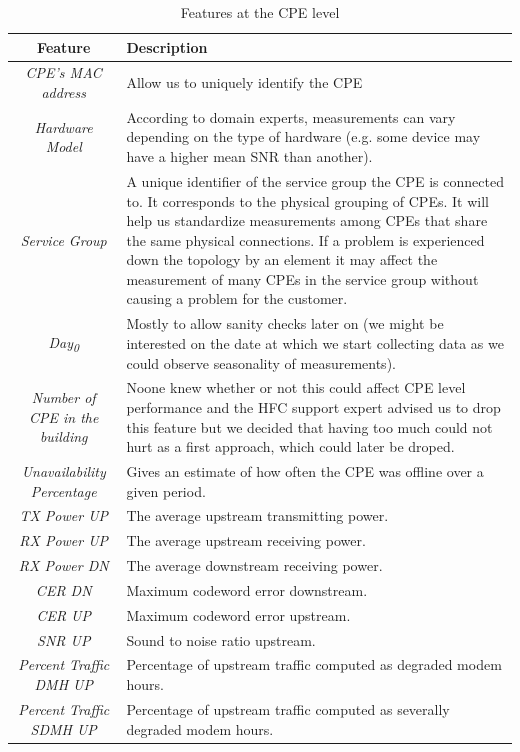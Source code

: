 \begin{table}[h]
\begin{center}
\begin{tabular}{c p{85mm}}
\hline
\textbf{Feature} & \textbf{Description}\\ 
\hline\hline
\textit{CPE's MAC address} & Allow us to uniquely identify the CPE  \\
\hline
\textit{Hardware Model} & According to domain experts, measurements can vary depending on the type of hardware (e.g. some device may have a higher mean SNR than another). \\
\hline
\textit{Service Group} & A unique identifier of the service group the CPE is connected to. It corresponds to the physical grouping of CPEs. It will help us standardize measurements among CPEs that share the same physical connections. If a problem is experienced down the topology by an element it may affect the measurement of many CPEs in the service group without causing a problem for the customer.\\
\hline
\textit{Day\textsubscript{0}} & Mostly to allow sanity checks later on (we might be interested on the date at which we start collecting data as we could observe seasonality of measurements).\\
\hline
\textit{Number of CPE in the building} & Noone knew whether or not this could affect CPE level performance and the HFC support expert advised us to drop this feature but we decided that having too much could not hurt as a first approach, which could later be droped.\\
\hline
\textit{Unavailability Percentage} & Gives an estimate of how often the CPE was offline over a given period.\\
\hline
\textit{TX Power UP} & The average upstream transmitting power.\\
\hline
\textit{RX Power UP} & The average upstream receiving power.\\
\hline
\textit{RX Power DN} & The average downstream receiving power.\\
\hline
\textit{CER DN} & Maximum codeword error downstream.\\
\hline
\textit{CER UP} & Maximum codeword error upstream.\\
\hline
\textit{SNR UP} & Sound to noise ratio upstream.\\
\hline
\textit{Percent Traffic DMH UP} & Percentage of upstream traffic computed as degraded modem hours.\\
\hline
\textit{Percent Traffic SDMH UP} & Percentage of upstream traffic computed as severally degraded modem hours.
\end{tabular}
\end{center}
\caption{\label{CPEMes}Features at the CPE level}
\end{table}

